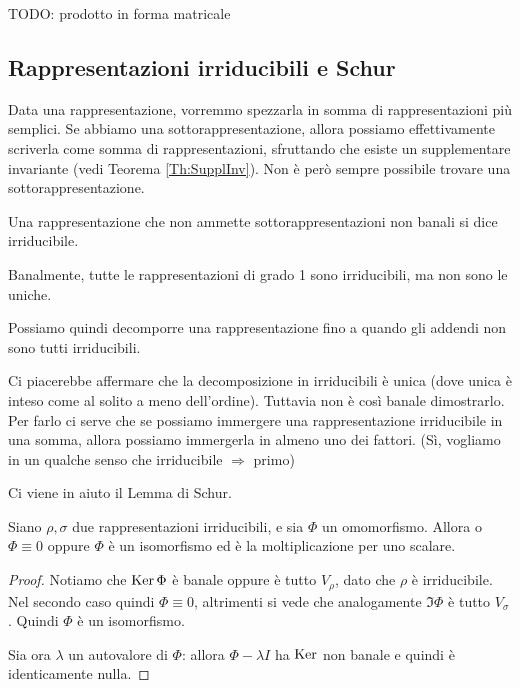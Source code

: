 \documentclass[a4paper,10pt,oneside]{math_article}
\newcommand{\id}{I}
\begin{document}
    TODO: prodotto in forma matricale

  
  \subsection{Rappresentazioni irriducibili e Schur}
    Data una rappresentazione, vorremmo spezzarla in somma di rappresentazioni più semplici. Se abbiamo una sottorappresentazione, allora possiamo effettivamente scriverla come somma di rappresentazioni, sfruttando che esiste un supplementare invariante (vedi Teorema \ref{Th:SupplInv}). Non è però sempre possibile trovare una sottorappresentazione.
    \begin{mydef}
      Una rappresentazione che non ammette sottorappresentazioni non banali si dice irriducibile.
    \end{mydef}
    
    Banalmente, tutte le rappresentazioni di grado 1 sono irriducibili, ma non sono le uniche.
    
    
    Possiamo quindi decomporre una rappresentazione fino a quando gli addendi non sono tutti irriducibili.
    
    Ci piacerebbe affermare che la decomposizione in irriducibili è unica (dove unica è inteso come al solito a meno dell'ordine). Tuttavia non è così banale dimostrarlo. Per farlo ci serve che se possiamo immergere una rappresentazione irriducibile in una somma, allora possiamo immergerla in almeno uno dei fattori. (Sì, vogliamo in un qualche senso che irriducibile $\Rightarrow$ primo)
    
    Ci viene in aiuto il Lemma di Schur.
    
    \begin{mytheorem}
     Siano $\rho,\sigma$ due rappresentazioni irriducibili, e sia $\Phi$ un omomorfismo. Allora o $\Phi \equiv 0$ oppure $\Phi$ è un isomorfismo ed è la moltiplicazione per uno scalare.
    \end{mytheorem}
    \begin{proof}
     Notiamo che $\operatorname{Ker} \Phi$ è banale oppure è tutto $V_\rho$, dato che $\rho$ è irriducibile. Nel secondo caso quindi $\Phi\equiv 0$, altrimenti si vede che analogamente $\Im \Phi$ è tutto $V_\sigma$. Quindi $\Phi$ è un isomorfismo.
     
     Sia ora $\lambda$ un autovalore di $\Phi$: allora $\Phi-\lambda\id$ ha $\operatorname{Ker}$ non banale e quindi è identicamente nulla.
    \end{proof}
    
\end{document}
